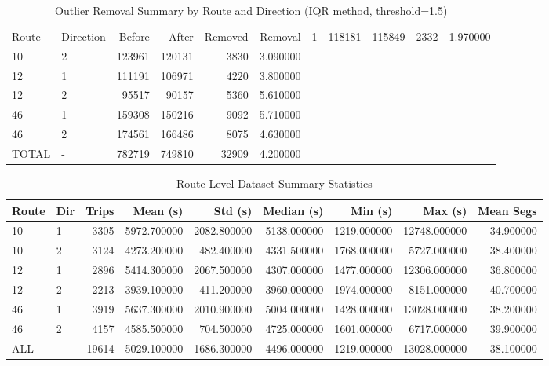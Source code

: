 \begin{table}
\caption{Outlier Removal Summary by Route and Direction (IQR method, threshold=1.5)}
\label{tab:outlier_removal}
\begin{tabular}{llrrrr}
\toprule
Route & Direction & Before & After & Removed & Removal %
 & 1 & 118181 & 115849 & 2332 & 1.970000 \\
10 & 2 & 123961 & 120131 & 3830 & 3.090000 \\
12 & 1 & 111191 & 106971 & 4220 & 3.800000 \\
12 & 2 & 95517 & 90157 & 5360 & 5.610000 \\
46 & 1 & 159308 & 150216 & 9092 & 5.710000 \\
46 & 2 & 174561 & 166486 & 8075 & 4.630000 \\
TOTAL & - & 782719 & 749810 & 32909 & 4.200000 \\
\bottomrule
\end{tabular}
\end{table}



\begin{table}
\caption{Route-Level Dataset Summary Statistics}
\label{tab:route_level_summary}
\begin{tabular}{llrrrrrrr}
\toprule
Route & Dir & Trips & Mean (s) & Std (s) & Median (s) & Min (s) & Max (s) & Mean Segs \\
\midrule
10 & 1 & 3305 & 5972.700000 & 2082.800000 & 5138.000000 & 1219.000000 & 12748.000000 & 34.900000 \\
10 & 2 & 3124 & 4273.200000 & 482.400000 & 4331.500000 & 1768.000000 & 5727.000000 & 38.400000 \\
12 & 1 & 2896 & 5414.300000 & 2067.500000 & 4307.000000 & 1477.000000 & 12306.000000 & 36.800000 \\
12 & 2 & 2213 & 3939.100000 & 411.200000 & 3960.000000 & 1974.000000 & 8151.000000 & 40.700000 \\
46 & 1 & 3919 & 5637.300000 & 2010.900000 & 5004.000000 & 1428.000000 & 13028.000000 & 38.200000 \\
46 & 2 & 4157 & 4585.500000 & 704.500000 & 4725.000000 & 1601.000000 & 6717.000000 & 39.900000 \\
ALL & - & 19614 & 5029.100000 & 1686.300000 & 4496.000000 & 1219.000000 & 13028.000000 & 38.100000 \\
\bottomrule
\end{tabular}
\end{table}



